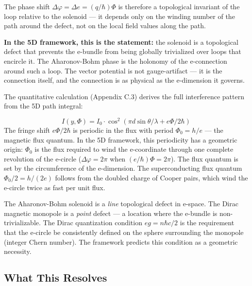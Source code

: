 \documentclass[aps,prd,preprint,superscriptaddress,longbibliography,floatfix]{revtex4-2}
\theoremstyle{remark}
\begin{document}
The phase shift $\Delta\varphi = \Delta e = (q/\hbar)\Phi$ is therefore a topological invariant of the loop relative to the solenoid --- it depends only on the winding number of the path around the defect, not on the local field values along the path.

\textbf{In the 5D framework, this is the statement:} the solenoid is a topological defect that prevents the e-bundle from being globally trivialized over loops that encircle it. The Aharonov-Bohm phase is the holonomy of the e-connection around such a loop. The vector potential is not gauge-artifact --- it is the connection itself, and the connection is as physical as the e-dimension it governs.

The quantitative calculation (Appendix C.3) derives the full interference pattern from the 5D path integral:


\begin{equation}
    I(y, \Phi) = I_{0} \cdot \cos^{2}(\pi d \sin \theta/\lambda + e\Phi/2\hbar)
\end{equation}
The fringe shift $e\Phi/2\hbar$ is periodic in the flux with period $\Phi_{0} = h/e$ --- the magnetic flux quantum. In the 5D framework, this periodicity has a geometric origin: $\Phi_{0}$ is the flux required to wind the e-coordinate through one complete revolution of the e-circle ($\Delta\varphi = 2\pi$ when $(e/\hbar)\Phi = 2\pi$). The flux quantum is set by the circumference of the e-dimension. The superconducting flux quantum $\Phi_{0}/2 = h/(2e)$ follows from the doubled charge of Cooper pairs, which wind the e-circle twice as fast per unit flux.

The Aharonov-Bohm solenoid is a \textit{line} topological defect in e-space. The Dirac magnetic monopole \cite{Dirac1931} is a \textit{point} defect --- a location where the e-bundle is non-trivializable. The Dirac quantization condition $eg = n\hbar c/2$ is the requirement that the e-circle be consistently defined on the sphere surrounding the monopole (integer Chern number). The framework predicts this condition as a geometric necessity.



\subsection{What This Resolves}
\end{document}
